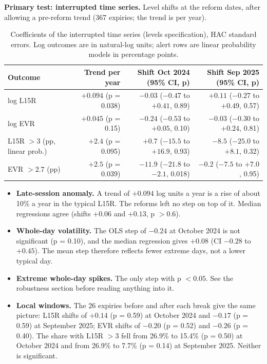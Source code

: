 \documentclass[10pt,a4paper]{article}
\begin{document}
\textbf{Primary test: interrupted time series.} Level shifts at the reform dates, after allowing a pre-reform trend (367 expiries; the trend is per year).
\begin{table}[h!]\centering\small
\begin{tabular}{lrrr}
\toprule
Outcome & Trend per year & Shift Oct 2024 (95\% CI, p) & Shift Sep 2025 (95\% CI, p)\\
\midrule
log L15R & $+0.094$ (p = 0.038) & $-0.03$ ($-0.47$ to $+0.41$, 0.89) & $+0.11$ ($-0.27$ to $+0.49$, 0.57)\\
log EVR & $+0.045$ (p = 0.15) & $-0.24$ ($-0.53$ to $+0.05$, 0.10) & $-0.03$ ($-0.30$ to $+0.24$, 0.81)\\
L15R $>3$ (pp, linear prob.) & $+2.4$ (p = 0.095) & $+0.7$ ($-15.5$ to $+16.9$, 0.93) & $-8.5$ ($-25.0$ to $+8.1$, 0.32)\\
EVR $>2.7$ (pp) & $+2.5$ (p = 0.039) & $-11.9$ ($-21.8$ to $-2.1$, 0.018) & $-0.2$ ($-7.5$ to $+7.0$, 0.95)\\
\bottomrule
\end{tabular}
\caption{Coefficients of the interrupted time series (levels specification), HAC standard errors. Log outcomes are in natural-log units; alert rows are linear probability models in percentage points.}
\end{table}
\begin{itemize}
\item \textbf{Late-session anomaly.} A trend of $+0.094$ log units a year is a rise of about 10\% a year in the typical L15R. The reforms left no step on top of it. Median regressions agree (shifts $+0.06$ and $+0.13$, p $>0.6$).
\item \textbf{Whole-day volatility.} The OLS step of $-0.24$ at October 2024 is not significant (p = 0.10), and the median regression gives $+0.08$ (CI $-0.28$ to $+0.45$). The mean step therefore reflects fewer extreme days, not a lower typical day.
\item \textbf{Extreme whole-day spikes.} The only step with p $<0.05$. See the robustness section before reading anything into it.
\item \textbf{Local windows.} The 26 expiries before and after each break give the same picture: L15R shifts of $+0.14$ (p = 0.59) at October 2024 and $-0.17$ (p = 0.59) at September 2025; EVR shifts of $-0.20$ (p = 0.52) and $-0.26$ (p = 0.40). The share with L15R $>3$ fell from 26.9\% to 15.4\% (p = 0.50) at October 2024 and from 26.9\% to 7.7\% (p = 0.14) at September 2025. Neither is significant.
\end{itemize}
\end{document}
